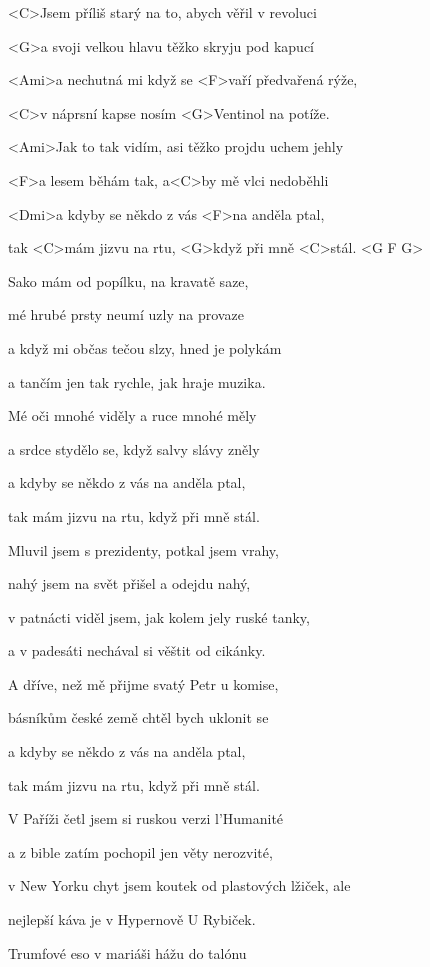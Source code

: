 

\zs
<C>Jsem příliš starý na to, abych věřil v revoluci

<G>a svoji velkou hlavu těžko skryju pod kapucí

<Ami>a nechutná mi když se <F>vaří předvařená rýže,

<C>v náprsní kapse nosím <G>Ventinol na potíže.

<Ami>Jak to tak vidím, asi těžko projdu uchem jehly

<F>a lesem běhám tak, a<C>by mě vlci nedoběhli

<Dmi>a kdyby se někdo z vás <F>na anděla ptal,

tak <C>mám jizvu na rtu, <G>když při mně <C>stál. <G F G>
\ks

\zs
Sako mám od popílku, na kravatě saze,

mé hrubé prsty neumí uzly na provaze

a když mi občas tečou slzy, hned je polykám

a tančím jen tak rychle, jak hraje muzika.

Mé oči mnohé viděly a ruce mnohé měly

a srdce stydělo se, když salvy slávy zněly

a kdyby se někdo z vás na anděla ptal,

tak mám jizvu na rtu, když při mně stál.
\ks

\zs
Mluvil jsem s prezidenty, potkal jsem vrahy,

nahý jsem na svět přišel a odejdu nahý,

v patnácti viděl jsem, jak kolem jely ruské tanky,

a v padesáti nechával si věštit od cikánky.

A dříve, než mě přijme svatý Petr u komise,

básníkům české země chtěl bych uklonit se

a kdyby se někdo z vás na anděla ptal,

tak mám jizvu na rtu, když při mně stál.
\ks

\zs
V Paříži četl jsem si ruskou verzi l'Humanité

a z bible zatím pochopil jen věty nerozvité,

v New Yorku chyt jsem koutek od plastových lžiček, ale

nejlepší káva je v Hypernově U Rybiček.

Trumfové eso v mariáši hážu do talónu

